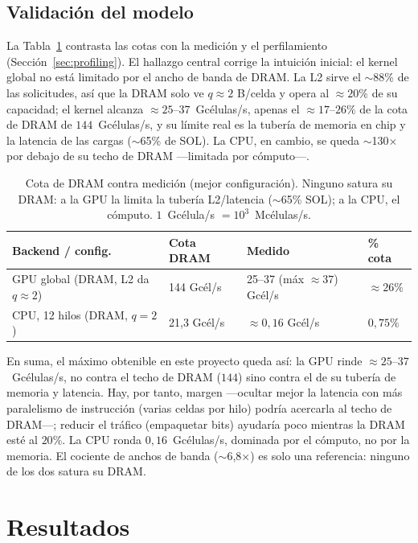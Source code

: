 \documentclass[
	spanish,
	letterpaper, oneside
]{article}
\begin{document}
\subsection{Validación del modelo}
\label{sec:cota-validacion}

La Tabla~\ref{tab:validacion} contrasta las cotas con la medición y el perfilamiento
(Sección~\ref{sec:profiling}). El hallazgo central corrige la intuición inicial: el
kernel global no está limitado por el ancho de banda de DRAM. La L2 sirve el
$\sim$88\% de las solicitudes, así que la DRAM solo ve $q\approx2$ B/celda y opera al
$\approx20\%$ de su capacidad; el kernel alcanza $\approx25$--$37$~Gcélulas/s, apenas
el $\approx17$--$26\%$ de la cota de DRAM de $144$~Gcélulas/s, y su límite real es la tubería
de memoria en chip y la latencia de las cargas ($\sim$65\% de SOL). La CPU, en cambio,
se queda $\sim$130$\times$ por debajo de su techo de DRAM ---limitada por cómputo---.

\begin{table}[H]
	\centering
	\caption{Cota de DRAM contra medición (mejor configuración). Ninguno satura su DRAM:
	a la GPU la limita la tubería L2/latencia ($\sim$65\% SOL); a la CPU, el cómputo.
	$1$~Gcélula/s $=10^{3}$~Mcélulas/s.}
	\label{tab:validacion}
	\begin{tabular}{@{}llll@{}}
		\toprule
		Backend / config. & Cota DRAM & Medido & \% cota \\
		\midrule
		GPU global (DRAM, L2 da $q\approx2$) & 144 Gcél/s    & 25--37 (máx $\approx37$) Gcél/s & $\approx26\%$ \\
		CPU, 12 hilos (DRAM, $q=2$)          & 21{,}3 Gcél/s & $\approx 0{,}16$ Gcél/s       & $0{,}75\%$ \\
		\bottomrule
	\end{tabular}
\end{table}

En suma, el máximo obtenible en este proyecto queda así: la GPU rinde
$\approx 25$--$37$~Gcélulas/s, no contra el techo de DRAM ($144$) sino contra el de su
tubería de memoria y latencia. Hay, por tanto, margen ---ocultar mejor la latencia con
más paralelismo de instrucción (varias celdas por hilo) podría acercarla al techo de
DRAM---; reducir el tráfico (empaquetar bits) ayudaría poco mientras la DRAM esté al
$20\%$. La CPU ronda $0{,}16$~Gcélulas/s, dominada por el cómputo, no por la memoria.
El cociente de anchos de banda ($\sim$6{,}8$\times$) es solo una referencia: ninguno de
los dos satura su DRAM.

\section{Resultados}
\label{sec:resultados}
\end{document}
